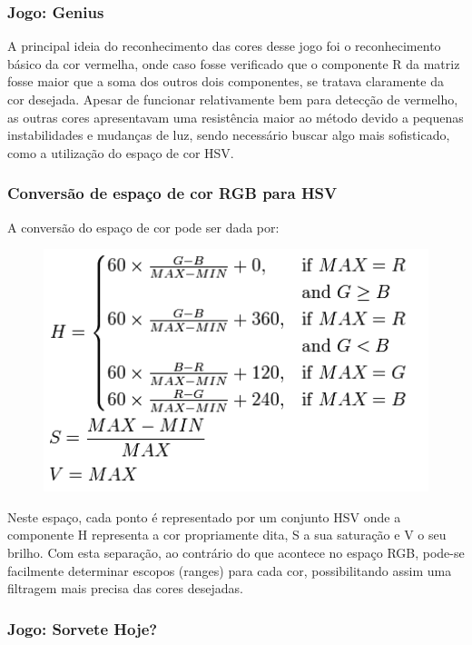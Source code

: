 \documentclass{sciposter}
\begin{document}
\begin{multicols}{3}
\subsubsection*{Jogo: Genius}

A principal ideia do reconhecimento das cores desse jogo foi o reconhecimento básico da cor vermelha, onde caso fosse verificado que o componente R da matriz fosse maior que a soma dos outros dois componentes, se tratava claramente da cor desejada. Apesar de funcionar relativamente bem para detecção de vermelho, as outras cores apresentavam uma resistência maior ao método devido a pequenas instabilidades e mudanças de luz, sendo necessário buscar algo mais sofisticado, como a utilização do espaço de cor HSV.

\subsubsection{Conversão de espaço de cor RGB para HSV}

A conversão do espaço de cor pode ser dada por:

\begin{figure}[ht]
\centering
\includegraphics[width=8in]{img4.png}
\end{figure}

Neste espaço, cada ponto é representado por um conjunto HSV onde a componente H representa a cor propriamente dita, S a sua saturação e V o seu brilho. Com esta separação, ao contrário do que acontece no espaço RGB, pode-se facilmente determinar escopos (ranges) para cada cor, possibilitando assim uma filtragem mais precisa das cores desejadas.

\subsubsection*{Jogo: Sorvete Hoje?}


\end{multicols}
\end{document}
